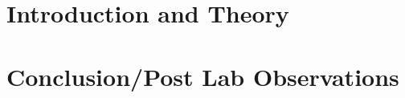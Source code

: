 \documentclass{../../ece-report}
\begin{document}
\maketitle


\section{Introduction and Theory}

\section{Conclusion/Post Lab Observations}
\end{document}
